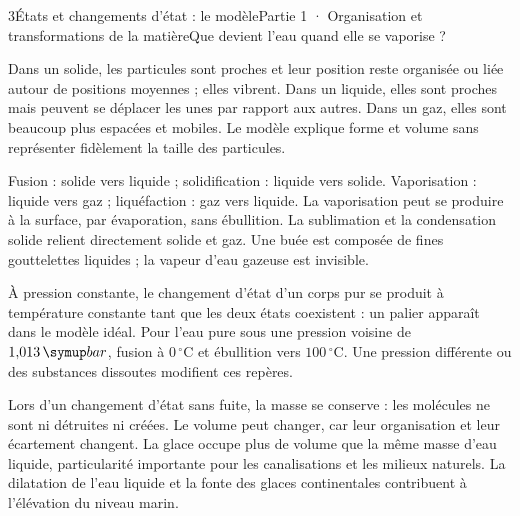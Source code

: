 \begin{ouverture}[college1]{3}{États et changements d’état : le modèle}{Partie 1 · Organisation et transformations de la matière}{Que devient l’eau quand elle se vaporise ?}
\end{ouverture}
\label{ess-3}
Dans un solide, les particules sont proches et leur position reste organisée ou liée autour de positions moyennes ; elles vibrent. Dans un liquide, elles sont proches mais peuvent se déplacer les unes par rapport aux autres. Dans un gaz, elles sont beaucoup plus espacées et mobiles. Le modèle explique forme et volume sans représenter fidèlement la taille des particules.\par
{}
Fusion : solide vers liquide ; solidification : liquide vers solide. Vaporisation : liquide vers gaz ; liquéfaction : gaz vers liquide. La vaporisation peut se produire à la surface, par évaporation, sans ébullition. La sublimation et la condensation solide relient directement solide et gaz. Une buée est composée de fines gouttelettes liquides ; la vapeur d’eau gazeuse est invisible.\par
\clearpage
{}
À pression constante, le changement d’état d’un corps pur se produit à température constante tant que les deux états coexistent : un palier apparaît dans le modèle idéal. Pour l’eau pure sous une pression voisine de $1{,}013\unite{bar}$, fusion à $0\,^{\circ}\mathrm C$ et ébullition vers $100\,^{\circ}\mathrm C$. Une pression différente ou des substances dissoutes modifient ces repères.\par
{}
Lors d’un changement d’état sans fuite, la masse se conserve : les molécules ne sont ni détruites ni créées. Le volume peut changer, car leur organisation et leur écartement changent. La glace occupe plus de volume que la même masse d’eau liquide, particularité importante pour les canalisations et les milieux naturels. La dilatation de l’eau liquide et la fonte des glaces continentales contribuent à l’élévation du niveau marin.\par
